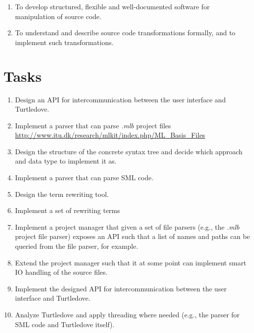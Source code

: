 \documentclass[a4paper,oneside]{article}
\begin{document}
\begin{enumerate}
\item To develop structured, flexible and well-documented software for manipulation of source code.
\item To understand and describe source code transformations formally, and to implement such
  transformations.
\end{enumerate}


\section{Tasks}

\begin{enumerate}

\item Design an API for intercommunication between the user interface and
  Turtledove.

\item Implement a parser that can parse \textit{.mlb} project files
  \url{http://www.itu.dk/research/mlkit/index.php/ML_Basis_Files}

\item Design the structure of the concrete syntax tree and decide which approach and data type to
  implement it as.

\item Implement a parser that can parse SML code.

\item Design the term rewriting tool.

\item Implement a set of rewriting terms

\item Implement a project manager that given a set of file parsers (e.g., the \textit{.mlb} project
  file parser) exposes an API such that a list of names and paths can be queried from the file
  parser, for example.

\item Extend the project manager such that it at some point can implement smart IO handling of the
  source files.

\item Implement the designed API for intercommunication between the user interface and Turtledove.

\item Analyze Turtledove and apply threading where needed (e.g., the parser for SML code and
  Turtledove itself).

\end{enumerate}
\end{document}
